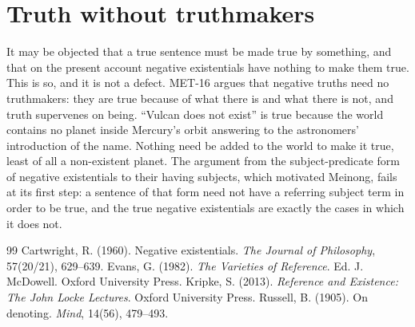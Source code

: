 \documentclass{situationist-preprint}
\begin{document}
\section{Truth without truthmakers}

It may be objected that a true sentence must be made true by something, and that on the present account negative existentials have nothing to make them true. This is so, and it is not a defect. MET-16 argues that negative truths need no truthmakers: they are true because of what there is and what there is not, and truth supervenes on being. \enquote{Vulcan does not exist} is true because the world contains no planet inside Mercury's orbit answering to the astronomers' introduction of the name. Nothing need be added to the world to make it true, least of all a non-existent planet. The argument from the subject-predicate form of negative existentials to their having subjects, which motivated Meinong, fails at its first step: a sentence of that form need not have a referring subject term in order to be true, and the true negative existentials are exactly the cases in which it does not.

\begin{thebibliography}{99}\small
{} Cartwright, R. (1960). Negative existentials. \emph{The Journal of Philosophy}, 57(20/21), 629--639.
 Evans, G. (1982). \emph{The Varieties of Reference}. Ed. J. McDowell. Oxford University Press.
 Kripke, S. (2013). \emph{Reference and Existence: The John Locke Lectures}. Oxford University Press.
 Russell, B. (1905). On denoting. \emph{Mind}, 14(56), 479--493.
\end{thebibliography}
\end{document}
